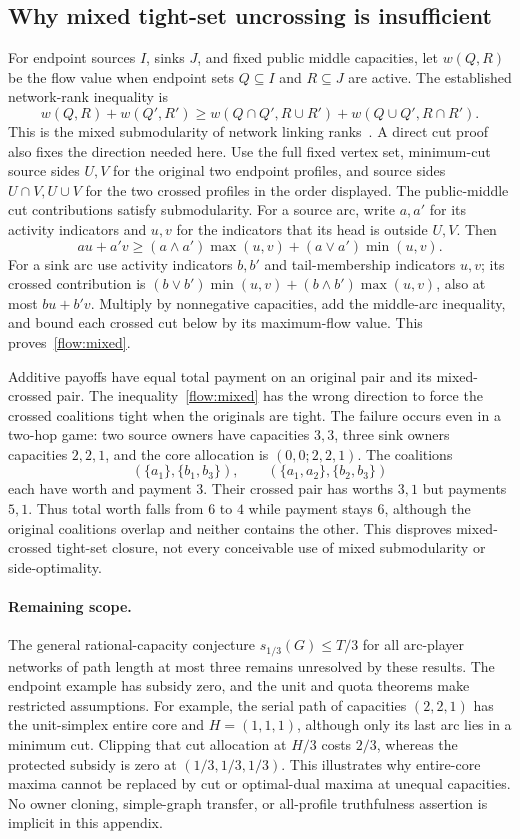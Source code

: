 \documentclass[11pt]{article}
\theoremstyle{remark}
\begin{document}
\subsection{Why mixed tight-set uncrossing is insufficient}
For endpoint sources $I$, sinks $J$, and fixed public middle capacities,
let $w(Q,R)$ be the flow value when endpoint sets $Q\subseteq I$ and
$R\subseteq J$ are active. The established network-rank inequality is
\begin{equation}\label{flow:mixed}
 w(Q,R)+w(Q',R')\ge
 w(Q\cap Q',R\cup R')+w(Q\cup Q',R\cap R').
\end{equation}
This is the mixed submodularity of network linking
ranks~\cite{flow:Goemans2011}. A direct cut proof also fixes the direction
needed here. Use the full fixed vertex set, minimum-cut source sides
$U,V$ for the original two endpoint profiles, and source sides
$U\cap V,U\cup V$ for the two crossed profiles in the order displayed.
The public-middle cut contributions satisfy submodularity. For a source
arc, write $a,a'$ for its activity indicators and $u,v$ for the
indicators that its head is outside $U,V$. Then
\[
 au+a'v\ge (a\wedge a')\max(u,v)+(a\vee a')\min(u,v).
\]
For a sink arc use activity indicators $b,b'$ and tail-membership
indicators $u,v$; its crossed contribution is
$(b\vee b')\min(u,v)+(b\wedge b')\max(u,v)$, also at most
$bu+b'v$. Multiply by nonnegative capacities, add the middle-arc
inequality, and bound each crossed cut below by its maximum-flow value.
This proves~\eqref{flow:mixed}.

Additive payoffs have equal total payment on an original pair and its
mixed-crossed pair. The inequality~\eqref{flow:mixed} has the wrong
direction to force the crossed coalitions tight when the originals are
tight. The failure occurs even in a two-hop game: two source owners have
capacities $3,3$, three sink owners capacities $2,2,1$, and the core
allocation is $(0,0;2,2,1)$. The coalitions
\[
 (\{a_1\},\{b_1,b_3\}),\qquad
 (\{a_1,a_2\},\{b_2,b_3\})
\]
each have worth and payment $3$. Their crossed pair has worths $3,1$
but payments $5,1$. Thus total worth falls from $6$ to $4$ while
payment stays $6$, although the original coalitions overlap and neither
contains the other. This disproves mixed-crossed tight-set closure, not
every conceivable use of mixed submodularity or side-optimality.

\paragraph{Remaining scope.}
The general rational-capacity conjecture
$s_{1/3}(G)\le T/3$ for all arc-player networks of path length at most
three remains unresolved by these results. The endpoint example has
subsidy zero, and the unit and quota theorems make restricted assumptions.
For example, the serial path of capacities $(2,2,1)$ has the unit-simplex
entire core and $H=(1,1,1)$, although only its last arc lies in a minimum
cut. Clipping that cut allocation at $H/3$ costs $2/3$, whereas the
protected subsidy is zero at $(1/3,1/3,1/3)$. This illustrates why
entire-core maxima cannot be replaced by cut or optimal-dual maxima at
unequal capacities. No owner cloning, simple-graph transfer, or all-profile
truthfulness assertion is implicit in this appendix.
\end{document}
